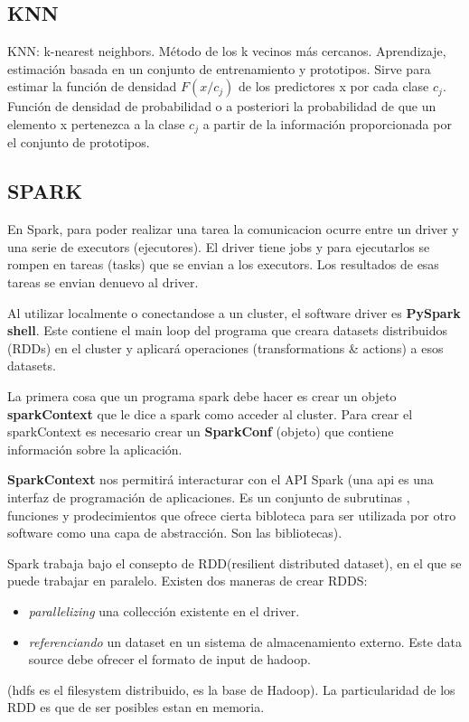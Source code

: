 \documentclass[titlepage,a4paper]{article}
\begin{document}
\subsection*{KNN} 
KNN: k-nearest neighbors. Método de los k vecinos más cercanos. Aprendizaje, estimación basada en un conjunto de entrenamiento y prototipos. Sirve para estimar la función de densidad $F(x/c_j)$ de los predictores x por cada clase $c_j$. Función de densidad de probabilidad o a posteriori la probabilidad de que un elemento x pertenezca a la clase $c_j$ a partir de la información proporcionada por el conjunto de prototipos. 

\subsection*{SPARK}
En Spark, para poder realizar una tarea la comunicacion ocurre entre un driver y una serie de executors (ejecutores). El driver tiene jobs y para ejecutarlos se rompen en tareas (tasks) que se envian a los executors. Los resultados de esas tareas se envian denuevo al driver.

Al utilizar localmente o conectandose a un cluster, el software driver es \textbf{PySpark shell}. Este contiene el main loop del programa que creara datasets distribuidos (RDDs) en el cluster y aplicará operaciones (transformations \& actions) a esos datasets.

La primera cosa que un programa spark debe hacer es crear un objeto \textbf{sparkContext }que le dice a spark como acceder al cluster. Para crear el sparkContext es necesario crear un \textbf{SparkConf} (objeto) que contiene información sobre la aplicación. 

\textbf{SparkContext} nos permitirá interacturar con el API  Spark (una api es una interfaz de programación de aplicaciones. Es un conjunto de subrutinas , funciones y prodecimientos que ofrece cierta bibloteca para ser utilizada por otro software como una capa de abstracción. Son las bibliotecas).

Spark trabaja bajo el consepto de RDD(resilient distributed dataset), en el que se puede trabajar en paralelo. Existen dos maneras de crear RDDS: 
\begin{itemize}
\item \textit{parallelizing} una collección existente en el driver. 
\item \textit{referenciando}  un dataset en un sistema de almacenamiento externo. Este data source debe ofrecer el formato de input de hadoop. 
\end{itemize}
(hdfs es el filesystem distribuido, es la base de Hadoop). 
La particularidad de los RDD es que de ser posibles estan en memoria. 
\end{document}

